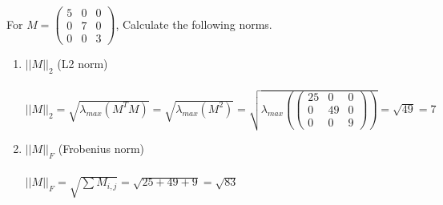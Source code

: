 \documentclass[a4paper]{article}
\theoremstyle{definition}
\newenvironment{soln}{
	\leavevmode\color{blue}\ignorespaces
}{}
\begin{document}
	For $M = \begin{pmatrix}
		5 & 0 & 0 \\ 0 & 7 & 0 \\ 0 & 0 & 3
		
	\end{pmatrix}$, Calculate the following norms.
	\begin{enumerate}\addtocounter{enumi}{3}
		\item $||M||_{2}$ (L2 norm) \\
		\begin{soln}\\
			$||M||_2 = \sqrt{\lambda_{max}(M^TM)} = \sqrt{\lambda_{max}(M^2)} = \sqrt{\lambda_{max}(\begin{pmatrix}
				25 & 0 & 0 \\ 0 & 49 & 0 \\ 0 & 0 & 9
			\end{pmatrix})} = \sqrt{49} = 7$
		\end{soln}
		
		\item $||M||_{F}$ (Frobenius norm)\\
		\begin{soln}\\
			$||M||_F  = \sqrt{\sum M_{i,j}} = \sqrt{25+49+9} = \sqrt{83}$
		\end{soln}
		
		
	\end{enumerate}
	
	
	
\end{document}
